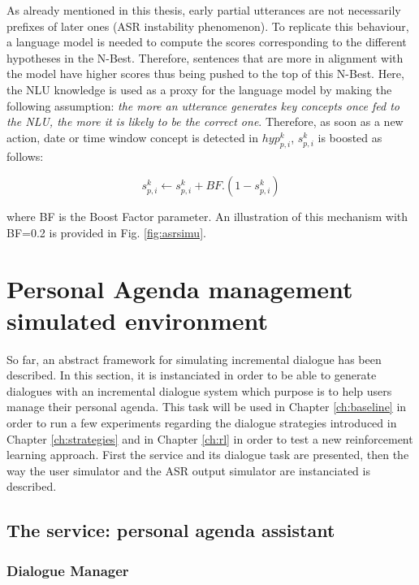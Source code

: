 					As already mentioned in this thesis, early partial utterances are not necessarily prefixes of later ones (ASR instability phenomenon). To replicate this behaviour, a language model is needed to compute the scores corresponding to the different hypotheses in the N-Best. Therefore, sentences that are more in alignment with the model have higher scores thus being pushed to the top of this N-Best. Here, the NLU knowledge is used as a proxy for the language model by making the following assumption: \textit{the more an utterance generates key concepts once fed to the NLU, the more it is likely to be the correct one}. Therefore, as soon as a new action, date or time window concept is detected in $hyp^k_{p,i}$, $s^k_{p,i}$ is boosted as follows:
					
						$$ s^k_{p,i} \leftarrow s^k_{p,i} + BF.(1 - s^k_{p,i}) $$
							
					where BF is the Boost Factor parameter. An illustration of this mechanism with BF=0.2 is provided in Fig. \ref{fig:asrsimu}.
					

\section{Personal Agenda management simulated environment}

	So far, an abstract framework for simulating incremental dialogue has been described. In this section, it is instanciated in order to be able to generate dialogues with an incremental dialogue system which purpose is to help users manage their personal agenda. This task will be used in Chapter \ref{ch:baseline} in order to run a few experiments regarding the dialogue strategies introduced in Chapter \ref{ch:strategies} and in Chapter \ref{ch:rl} in order to test a new reinforcement learning approach. First the service and its dialogue task are presented, then the way the user simulator and the ASR output simulator are instanciated is described.
	
	\subsection{The service: personal agenda assistant}
	
		\subsubsection{Dialogue Manager}
		
